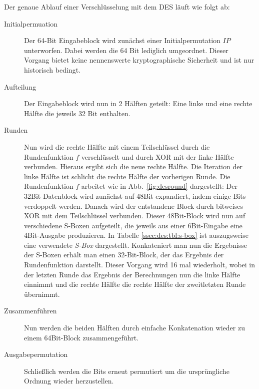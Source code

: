 \clearpage
Der genaue Ablauf einer Verschlüsselung mit dem DES läuft wie folgt ab:
\begin{description}
	\item[Initialpermuation] Der 64-Bit Eingabeblock wird zunächst einer Initialpermutation $IP$ unterworfen. Dabei werden die 64 Bit lediglich umgeordnet. Dieser
	Vorgang bietet keine nennenswerte kryptographische Sicherheit und ist nur historisch bedingt.
	\item[Aufteilung] Der Eingabeblock wird nun in 2 Hälften geteilt: Eine linke und eine rechte Hälfte die jeweils 32 Bit enthalten.
	\item[Runden] Nun wird die rechte Hälfte mit einem Teilschlüssel durch die Rundenfunktion $f$ verschlüsselt und durch XOR mit der linke Hälfte verbunden.
	Hieraus ergibt sich die neue rechte Hälfte. Die Iteration der linke Hälfte ist schlicht die rechte Hälfte der vorherigen Runde. Die Rundenfunktion $f$
	arbeitet wie in Abb.~\ref{fig:desround} dargestellt: Der 32Bit-Datenblock wird zunächst auf 48Bit expandiert, indem einige Bits verdoppelt werden. Danach wird
	der entstandene Block durch bitweises XOR mit dem Teilschlüssel verbunden. Dieser 48Bit-Block wird nun auf verschiedene S-Boxen aufgeteilt, die jeweils aus einer 6Bit-Eingabe eine 4Bit-Ausgabe produzieren. In Tabelle \ref{ssec:des:tbl:s-box} ist auszugsweise eine verwendete \textit{S-Box} dargestellt. Konkateniert man nun die Ergebnisse der S-Boxen erhält man einen 32-Bit-Block, der das Ergebnis der
	Rundenfunktion darstellt. Dieser Vorgang wird 16 mal wiederholt, wobei in der letzten Runde das Ergebnis der Berechnungen nun die linke Hälfte einnimmt und
	die rechte Hälfte die rechte Hälfte der zweitletzten Runde übernimmt.
	\item[Zusammenführen] Nun werden die beiden Hälften durch einfache Konkatenation wieder zu einem 64Bit-Block zusammengeführt.
	\item[Ausgabepermutation] Schließlich werden die Bits erneut permutiert um die ursprüngliche Ordnung wieder herzustellen.
\end{description}


